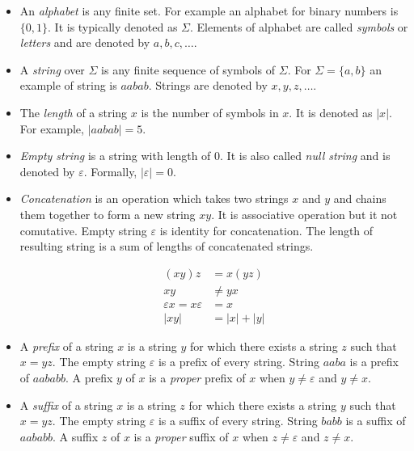 \documentclass[12pt,final,oneside]{fithesis2}
\theoremstyle{definition}
\begin{document}
\begin{itemize}

\item An \textit{alphabet} is any finite set. For example an alphabet for
binary numbers is $\{0, 1\}$. It is typically denoted as $\Sigma$. Elements
of alphabet are called \textit{symbols} or \textit{letters} and are denoted
by $a, b, c, \dots$.

\item A \textit{string} over $\Sigma$ is any finite sequence of symbols of
$\Sigma$. For $\Sigma = \{a, b\}$ an example of string is $aabab$. Strings
are denoted by $x, y, z, \dots$.

\item The \textit{length} of a string $x$ is the number of symbols in $x$.
It is denoted as $|x|$. For example, $|aabab| = 5$.

\item \textit{Empty string} is a string with length of 0. It is also called
\textit{null string} and is denoted by $\varepsilon$. Formally,
$|\varepsilon| = 0$.

\item \textit{Concatenation} is an operation which takes two strings $x$
and $y$ and chains them together to form a new string $xy$. It is
associative operation but it not comutative. Empty string $\varepsilon$ is
identity for concatenation. The length of resulting string is a sum of
lengths of concatenated strings.

\begin{align*}
(xy)z &= x(yz) \\
xy &\neq yx \\
\varepsilon x = x \varepsilon &= x \\
|xy| &= |x| + |y|
\end{align*}

\item A \textit{prefix} of a string $x$ is a string $y$ for which there
exists a string $z$ such that $x = yz$. The empty string $\varepsilon$ is
a prefix of every string. String $aaba$ is a prefix of $aababb$. A prefix
$y$ of $x$ is a \textit{proper} prefix of $x$ when $y \neq \varepsilon$ and
$y \neq x$.

\item A \textit{suffix} of a string $x$ is a string $z$ for which there
exists a string $y$ such that $x = yz$. The empty string $\varepsilon$ is
a suffix of every string. String $babb$ is a suffix of $aababb$. A suffix
$z$ of $x$ is a \textit{proper} suffix of $x$ when $z \neq \varepsilon$ and
$z \neq x$.

\end{itemize}
\end{document}
